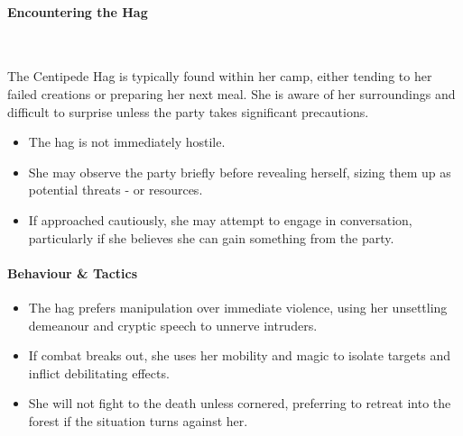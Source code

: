 \paragraph*{Encountering the Hag}\hfill\\
{\entryfont The Centipede Hag is typically found within her camp, either tending to her failed creations or preparing her next meal. She is aware of her surroundings and difficult to surprise unless the party takes significant precautions.
\begin{itemize}
	\item The hag is not immediately hostile.
	\item She may observe the party briefly before revealing herself, sizing them up as potential threats - or resources.
	\item If approached cautiously, she may attempt to engage in conversation, particularly if she believes she can gain something from the party.
\end{itemize}}
\paragraph*{Behaviour \& Tactics}
{\entryfont\begin{itemize}
	\item The hag prefers manipulation over immediate violence, using her unsettling demeanour and cryptic speech to unnerve intruders.
	\item If combat breaks out, she uses her mobility and magic to isolate targets and inflict debilitating effects.
	\item She will not fight to the death unless cornered, preferring to retreat into the forest if the situation turns against her.
\end{itemize}}
\vfill\eject
